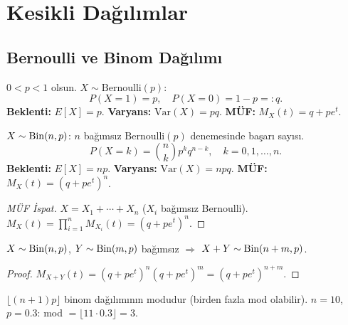 \section{Kesikli Dağılımlar}
\label{sec:kesikli_dagilimlar}

\subsection{Bernoulli ve Binom Dağılımı}
\label{subsec:bernoulli_binom}

\begin{tanim}
\label{def:bernoulli}
$0 < p < 1$ olsun. $X \sim \mathrm{Bernoulli}(p)$:
\[
  P(X = 1) = p, \quad P(X = 0) = 1 - p =: q.
\]
\textbf{Beklenti:} $E[X] = p$. \quad
\textbf{Varyans:} $\mathrm{Var}(X) = pq$. \quad
\textbf{MÜF:} $M_X(t) = q + pe^t$.
\end{tanim}

\begin{tanim}
\label{def:binom}
$X \sim \operatorname{Bin}(n, p)$: $n$ bağımsız $\mathrm{Bernoulli}(p)$ denemesinde başarı sayısı.
\[
  P(X = k) = \binom{n}{k} p^k q^{n-k}, \quad k = 0, 1, \ldots, n.
\]
\textbf{Beklenti:} $E[X] = np$. \quad
\textbf{Varyans:} $\mathrm{Var}(X) = npq$. \quad
\textbf{MÜF:} $M_X(t) = (q + pe^t)^n$.
\end{tanim}

\begin{proof}[MÜF İspat]
$X = X_1 + \cdots + X_n$ ($X_i$ bağımsız Bernoulli).
$M_X(t) = \prod_{i=1}^n M_{X_i}(t) = (q+pe^t)^n$.
\end{proof}

\begin{teorem}
\label{thm:binom_yeniden}
$X \sim \operatorname{Bin}(n, p)$, $Y \sim \operatorname{Bin}(m, p)$ bağımsız $\Rightarrow$
$X + Y \sim \operatorname{Bin}(n+m, p)$.
\end{teorem}

\begin{proof}
$M_{X+Y}(t) = (q+pe^t)^n(q+pe^t)^m = (q+pe^t)^{n+m}$.
\end{proof}

\begin{onerme}
$\lfloor (n+1)p \rfloor$ binom dağılımının modudur (birden fazla mod olabilir).
$n = 10$, $p = 0.3$: mod $= \lfloor 11 \cdot 0.3 \rfloor = 3$.
\end{onerme}

